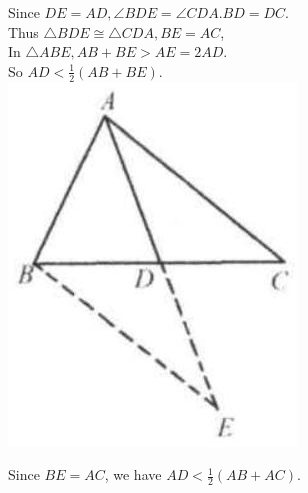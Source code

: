 \documentclass{article}
\begin{document}
Since \(D E=A D, \angle B D E=\angle C D A . B D=D C\).\\
Thus \(\triangle B D E \cong \triangle C D A, B E=A C\),\\
In \(\triangle A B E, A B+B E>A E=2 A D\).\\
So \(A D<\frac{1}{2}(A B+B E)\).\\
\centering
\includegraphics[width=\textwidth]{images/reasoning_image_1.jpg}

Since \(B E=A C\), we have \(A D<\frac{1}{2}(A B+A C)\).
\end{document}
